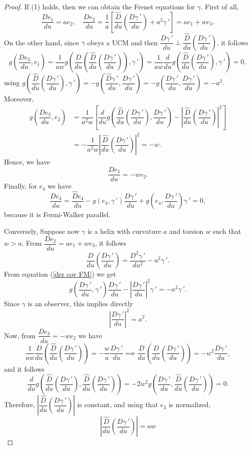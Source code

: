 \documentclass[11pt]{book}
\begin{document}
\begin{proof}
If (1) holds, then we can obtain the Frenet equations for $\gamma$. First of all,
\[
\dfrac{De_1}{du}=ae_2, \quad \dfrac{De_2}{du}=\dfrac{1}{a}\left[ \dfrac{\widehat{D}}{du}\left(\dfrac{D\gamma{\,'}}{du}\right)+a^2\gamma{\,'}\right]=ae_1+we_3.
\]
On the other hand, since $\gamma$ obeys a UCM and then $\dfrac{D\gamma{\,'}}{du} \perp \dfrac{\widehat{D}}{du}\left(\dfrac{D\gamma{\,'}}{du}\right)$, it follows
\[
g\left(\dfrac{De_3}{du},e_1\right)=\dfrac{1}{aw}g\left( \dfrac{D}{du}\left( \dfrac{\widehat{D}}{du}\left(\dfrac{D\gamma{\,'}}{du}\right)\right),\gamma{\,'} \right)= \dfrac{1}{aw} \dfrac{d}{du}g\left(\dfrac{\widehat{D}}{du}\left(\dfrac{D\gamma{\,'}}{du}\right), \gamma{\,'}\right) =0,
\]
using $g\left(\dfrac{\widehat{D}}{du}\left(\dfrac{D\gamma{\,'}}{du}\right), \gamma{\,'}\right)=-g\left(\dfrac{\widehat{D}\gamma{\,'}}{du}, \dfrac{D\gamma{\,'}}{du}\right)=-g\left(\dfrac{D\gamma{\,'}}{du}, \dfrac{D\gamma{\,'}}{du}\right)=-a^2$.
Moreover,
\begin{align*}
g\left(\dfrac{De_3}{du},e_2\right) & =\dfrac{1}{a^2w} \left[\dfrac{d}{du}g\left( \dfrac{\widehat{D}}{du}\left(\dfrac{D\gamma{\,'}}{du}\right),\dfrac{D\gamma{\,'}}{du} \right)-\left|\dfrac{\widehat{D}}{du}\left(\dfrac{D\gamma{\,'}}{du}\right)\right|^2 \right] \\[2mm] 
& = -\dfrac{1}{a^2w} \left|\dfrac{\widehat{D}}{du}\left(\dfrac{D\gamma{\,'}}{du}\right)\right|^2=-w.
\end{align*}
Hence, we have
\[
\dfrac{De_3}{du}=-we_2.
\]
Finally, for $e_4$ we have
\[
\dfrac{De_4}{du}=\dfrac{\widehat{D}e_4}{du}-g(e_4,\gamma{\,'})\dfrac{D\gamma{\,'}}{du}+g\left(e_4,\dfrac{D\gamma{\,'}}{du}\right)\gamma{\,'}=0,
\]
because it is Fermi-Walker parallel. 


Conversely, Suppose now $\gamma$ is a helix with curvature $a$ and torsion $w$ such that $w>a$. From $\dfrac{De_2}{du}=ae_1+we_3$, it follows
\[
\dfrac{\widehat{D}}{du}\left(\dfrac{D\gamma{\,'}}{du}\right)=\dfrac{D^2\gamma{\,'}}{du^2}-a^2\gamma{\,'}.
\]
From equation {\rm (\ref{der cov FM})} we get
\[
g\left(\dfrac{D\gamma{\,'}}{du},\gamma{\,'}\right)\dfrac{D\gamma{\,'}}{du}-\left|\dfrac{D\gamma{\,'}}{du}\right|^2\gamma{\,'}=-a^2\gamma{\,'}.
\]
Since $\gamma$ is an observer, this implies directly
\[
\left|\dfrac{D\gamma{\,'}}{du}\right|^2=a^2.
\]
Now, from $\dfrac{De_3}{du}=-we_2$ we have
\[
\dfrac{1}{aw}\dfrac{D}{du}\left(\dfrac{\widehat{D}}{du}\left(\dfrac{D\gamma{\,'}}{du}\right)\right)=-\dfrac{w}{a}\dfrac{D\gamma{\,'}}{du} \implies \dfrac{D}{du}\left(\dfrac{\widehat{D}}{du}\left(\dfrac{D\gamma{\,'}}{du}\right)\right)=-w^2\dfrac{D\gamma{\,'}}{du},
\]
and it follows
\[
\dfrac{d}{du}g\left(\dfrac{\widehat{D}}{du}\left(\dfrac{D\gamma{\,'}}{du}\right),\dfrac{\widehat{D}}{du}\left(\dfrac{D\gamma{\,'}}{du}\right)\right)=-2w^2g\left(\dfrac{D\gamma{\,'}}{du},\dfrac{\widehat{D}}{du}\left(\dfrac{D\gamma{\,'}}{du}\right)\right)=0.
\]
Therefore, $\left|\dfrac{\widehat{D}}{du}\left(\dfrac{D\gamma{\,'}}{du}\right)\right|$ is constant, and using that $e_3$ is normalized,
\[
\left|\dfrac{\widehat{D}}{du}\left(\dfrac{D\gamma{\,'}}{du}\right)\right|=aw
\]
\end{proof}
\end{document}
